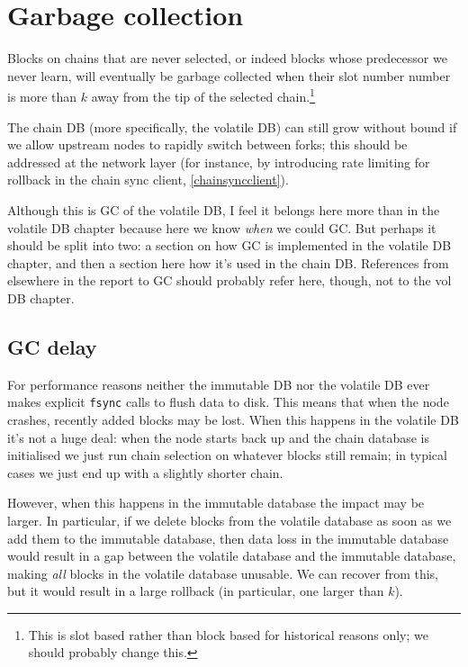 \section{Garbage collection}
\label{chaindb:gc}

Blocks on chains that are never selected, or indeed blocks whose
predecessor we never learn, will eventually be garbage collected when their
slot number number is more than $k$ away from the tip of the selected chain.\footnote{This is slot based rather than block based for historical
reasons only; we should probably change this.}

\begin{bug}
The chain DB (more specifically, the volatile DB) can still grow without bound
if we allow upstream nodes to rapidly switch between forks; this should be
addressed at the network layer (for instance, by introducing rate limiting for
rollback in the chain sync client, \cref{chainsyncclient}).
\end{bug}

Although this is GC of the volatile DB, I feel it belongs here more than in
the volatile DB chapter because here we know \emph{when} we could GC.
But perhaps it should be split into two: a section on how GC is implemented
in the volatile DB chapter, and then a section here how it's used in the
chain DB. References from elsewhere in the report to GC should probably
refer here, though, not to the vol DB chapter.

\subsection{GC delay}

For performance reasons neither the immutable DB nor the volatile DB ever makes
explicit \lstinline!fsync! calls to flush data to disk. This means that when the
node crashes, recently added blocks may be lost. When this happens in the
volatile DB it's not a huge deal: when the node starts back up and the chain
database is initialised we just run chain selection on whatever blocks still
remain; in typical cases we just end up with a slightly shorter chain.

However, when this happens in the immutable database the impact may be larger.
In particular, if we delete blocks from the volatile database as soon as we add
them to the immutable database, then data loss in the immutable database would
result in a gap between the volatile database and the immutable database, making
\emph{all} blocks in the volatile database unusable. We can recover from this, but it
would result in a large rollback (in particular, one larger than $k$).


